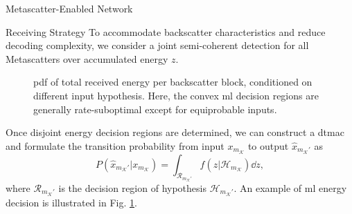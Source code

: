 \documentclass[journal]{IEEEtran}
\begin{document}
\begin{section}{Metascatter-Enabled Network}
\begin{subsection}{Receiving Strategy}
		To accommodate backscatter characteristics and reduce decoding complexity, we consider a joint semi-coherent detection for all Metascatters over accumulated energy $z$.
		\begin{figure}[!t]
			\centering
			\resizebox{0.9\columnwidth}{!}{
				
			}
			\caption{
				\gls{pdf} of total received energy per backscatter block, conditioned on different input hypothesis.
				Here, the convex \gls{ml} decision regions are generally rate-suboptimal except for equiprobable inputs.
			}
			\label{fi:energy_distribution}
		\end{figure}
		Once disjoint energy decision regions are determined, we can construct a \gls{dtmac} and formulate the transition probability from input $x_{m_{\mathcal{K}}}$ to output $\hat{x}_{m_{\mathcal{K}}'}$ as
		\begin{equation}
			P(\hat{x}_{m_{\mathcal{K}}'}|x_{m_{\mathcal{K}}}) = \int_{\mathcal{R}_{m_{\mathcal{K}}'}} f(z|\mathcal{H}_{m_{\mathcal{K}}}) \dd z,
			\label{eq:dtmac}
		\end{equation}
		where $\mathcal{R}_{m_{\mathcal{K}}'}$ is the decision region of hypothesis $\mathcal{H}_{m_{\mathcal{K}}'}$. An example of \gls{ml} energy decision is illustrated in Fig. \ref{fi:energy_distribution}.


\end{subsection}
\end{section}
\end{document}
